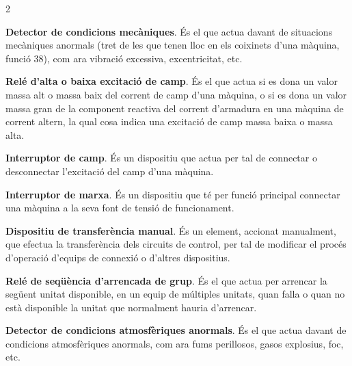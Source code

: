 \begin{multicols}{2}
\begin{list}{}
		\item[\textbf{39}]  
		\textbf{Detector de condicions mecàniques}. És el que actua davant
		de situacions mecàniques anormals (tret de les que tenen lloc en els
		coixinets d'una màquina, funció 38), com ara vibració excessiva,
		excentricitat, etc.
		
		\item[\textbf{40}]  
		\textbf{Relé d'alta o baixa excitació de camp}. És el que actua si es dona un valor massa alt o massa baix del corrent de camp d'una màquina, o si es dona un valor
		massa gran de la component reactiva del corrent d'armadura en una màquina de corrent
		altern, la qual cosa indica una excitació de camp massa baixa o massa alta.
		
		\item[\textbf{41}]   
		\textbf{Interruptor de camp}. És un dispositiu
		que actua per tal de connectar o desconnectar l'excitació del camp
		d'una màquina.
		
		\item[\textbf{42}]   
		\textbf{Interruptor de marxa}. És un
		dispositiu que té per funció principal connectar una màquina a la
		seva font de tensió de funcionament.
		
		\item[\textbf{43}]  
		\textbf{Dispositiu de transferència manual}. És
		un element, accionat manualment, que efectua la transferència dels circuits de control, per tal
		de modificar el procés d'operació d'equips de connexió o d'altres dispositius.
		
		\item[\textbf{44}]   
		\textbf{Relé de seqüència d'arrencada de grup}. És el que actua per arrencar la següent unitat
		disponible, en un equip de múltiples unitats, quan falla o quan no
		està disponible la unitat que normalment hauria d'arrencar.
		
		\item[\textbf{45}]   
		\textbf{Detector de condicions atmosfèriques anormals}. És el que actua davant de condicions atmosfèriques anormals, com ara fums
		perillosos, gasos explosius, foc, etc.
		

\end{list}
\end{multicols}
